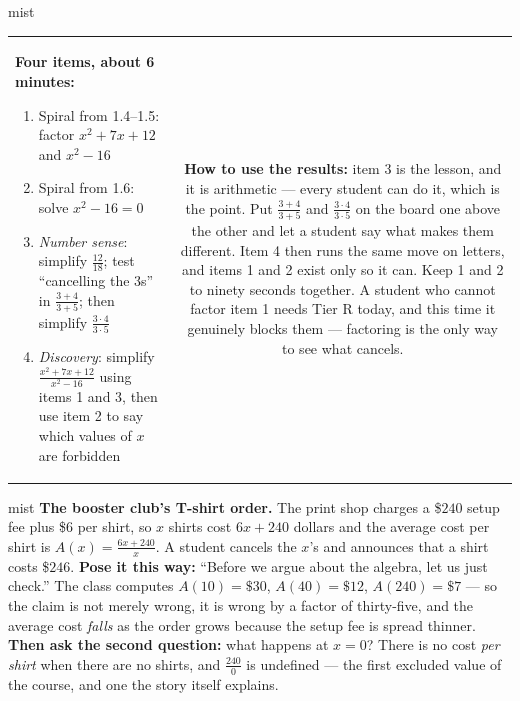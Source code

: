 \documentclass[10pt]{article}
\begin{document}
\begin{fixedskillbox}{mist}
\begin{tabularx}{\linewidth}{@{}X c@{}}
\begin{minipage}[t]{0.55\linewidth}\vspace{0pt}
\textbf{Four items, about 6 minutes:}
\begin{enumerate}[leftmargin=1.4em, itemsep=1pt, topsep=2pt]
  \item Spiral from 1.4--1.5: factor $x^2+7x+12$ and $x^2-16$
  \item Spiral from 1.6: solve $x^2-16=0$
  \item \emph{Number sense}: simplify $\tfrac{12}{18}$; test ``cancelling the $3$s'' in
        $\tfrac{3+4}{3+5}$; then simplify $\tfrac{3 \cdot 4}{3 \cdot 5}$
  \item \emph{Discovery}: simplify $\tfrac{x^2+7x+12}{x^2-16}$ using items 1 and 3, then use item 2
        to say which values of $x$ are forbidden
\end{enumerate}
\end{minipage}
&
\begin{minipage}[t]{0.38\linewidth}\vspace{0pt}
\textbf{How to use the results:} item 3 is the lesson, and it is arithmetic --- every student can
do it, which is the point. Put $\tfrac{3+4}{3+5}$ and $\tfrac{3\cdot4}{3\cdot5}$ on the board one
above the other and let a student say what makes them different. Item 4 then runs the same move on
letters, and items 1 and 2 exist only so it can. Keep 1 and 2 to ninety seconds together. A student
who cannot factor item 1 needs Tier R today, and this time it genuinely blocks them --- factoring
is the only way to see what cancels.
\end{minipage}
\end{tabularx}
\end{fixedskillbox}

\begin{skillbox}[Hook]{mist}
\textbf{The booster club's T-shirt order.} The print shop charges a \$$240$ setup fee plus \$$6$ per
shirt, so $x$ shirts cost $6x+240$ dollars and the average cost per shirt is
$A(x)=\frac{6x+240}{x}$. A student cancels the $x$'s and announces that a shirt costs \$$246$.
\textbf{Pose it this way:} ``Before we argue about the algebra, let us just check.'' The class
computes $A(10)=\$30$, $A(40)=\$12$, $A(240)=\$7$ --- so the claim is not merely wrong, it is
wrong by a factor of thirty-five, and the average cost \emph{falls} as the order grows because the
setup fee is spread thinner. \textbf{Then ask the second question:} what happens at $x=0$? There is
no cost \emph{per shirt} when there are no shirts, and $\frac{240}{0}$ is undefined --- the first
excluded value of the course, and one the story itself explains.
\end{skillbox}
\end{document}

